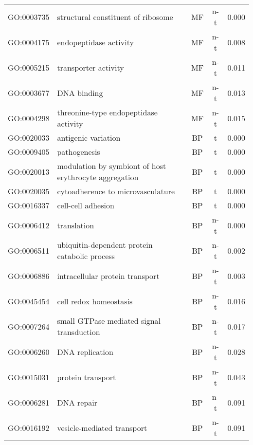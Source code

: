 \documentclass{article}
\begin{document}
\begin{table}
\begin{center}
\begin{tabular}{llccc}
GO:0003735 & structural constituent of ribosome & MF  & n-t & 0.000\\
GO:0004175 & endopeptidase activity & MF  & n-t  & 0.008\\
GO:0005215 & transporter activity & MF  & n-t  & 0.011\\
GO:0003677 & DNA binding & MF  & n-t  & 0.013\\
GO:0004298 & threonine-type endopeptidase activity & MF  & n-t  & 0.015\\
GO:0020033 & antigenic variation & BP & t & 0.000\\
GO:0009405 & pathogenesis & BP & t & 0.000\\
GO:0020013 & modulation by symbiont of host erythrocyte aggregation & BP & t & 0.000\\
GO:0020035 & cytoadherence to microvasculature & BP & t & 0.000\\
GO:0016337 & cell-cell adhesion & BP & t & 0.000\\
GO:0006412 & translation & BP & n-t  & 0.000\\
GO:0006511 & ubiquitin-dependent protein catabolic process & BP & n-t  & 0.002\\
GO:0006886 & intracellular protein transport & BP & n-t  & 0.003\\
GO:0045454 & cell redox homeostasis & BP & n-t  & 0.016\\
GO:0007264 & small GTPase mediated signal transduction & BP & n-t  & 0.017\\
GO:0006260 & DNA replication & BP & n-t  & 0.028\\
GO:0015031 & protein transport & BP & n-t  & 0.043\\
GO:0006281 & DNA repair & BP & n-t  & 0.091\\
GO:0016192 & vesicle-mediated transport & BP & n-t  & 0.091\\
\hline
\end{tabular}
\end{center}
\label{table:SchizontsFirstPro}
\end{table}
\clearpage
\end{document}
